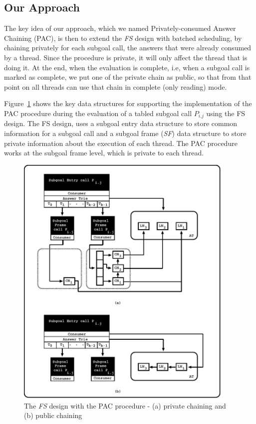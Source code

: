 \documentclass{llncs}
\begin{document}
\subsection{Our Approach}

The key idea of our approach, which we named Privately-consumed Answer
Chaining (PAC), is then to extend the \emph{FS} design with batched
scheduling, by chaining privately for each subgoal call, the answers
that were already consumed by a thread. Since the procedure is
private, it will only affect the thread that is doing it. At the end,
when the evaluation is complete, i.e, when a subgoal call is marked as
complete, we put one of the private chain as public, so that from that
point on all threads can use that chain in complete (only reading)
mode.

Figure~\ref{fig_tabtries_pcc} shows the key data structures for
supporting the implementation of the PAC procedure during the
evaluation of a tabled subgoal call $P_{i.j}$ using the FS design. The
FS design, uses a subgoal entry data structure to store common
information for a subgoal call and a subgoal frame (\emph{SF}) data
structure to store private information about the execution of each
thread. The PAC procedure works at the subgoal frame level, which is
private to each thread. 

\begin{figure}[!ht]
\centering
\includegraphics[width=10.5cm]{figures/pcc.pdf}
\caption{The \emph{FS} design with the PAC procedure - (a) private
  chaining and (b) public chaining}
\label{fig_tabtries_pcc}
\end{figure}
\end{document}

